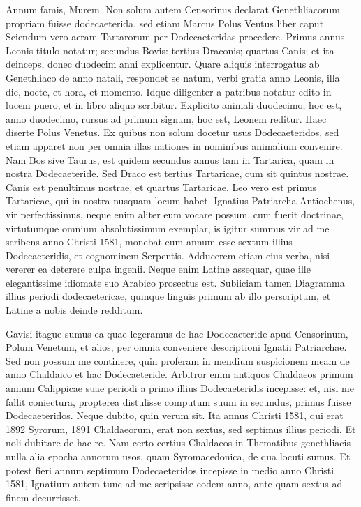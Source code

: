 Annum famis, Murem.
Non solum
autem Censorinus %
 declarat Genethliacorum propriam fuisse dodecaeterida,
sed etiam Marcus Polus Ventus liber  caput 
Sciendum vero
aeram Tartarorum per Dodecaeteridas procedere.
Primus annus Leonis
titulo notatur; secundus Bovis: tertius Draconis; quartus Canis; et
ita deinceps, donec duodecim anni explicentur.
Quare aliquis interrogatus
ab %
 Genethliaco de anno natali, respondet se natum, verbi gratia
anno Leonis, illa die, nocte, et hora, et momento.
Idque diligenter
a patribus notatur edito in lucem puero, et in libro aliquo scribitur.
%
Explicito animali duodecimo, hoc est, anno duodecimo,
 rursus ad
primum signum, hoc est, Leonem reditur.
Haec diserte Polus Venetus.
Ex quibus non solum docetur usus Dodecaeteridos, sed etiam apparet
non per omnia illas nationes in nominibus animalium convenire.
Nam Bos sive Taurus, est quidem secundus annus tam in Tartarica,
quam in nostra Dodecaeteride.
Sed Draco est tertius Tartaricae, cum
sit quintus nostrae.
Canis est penultimus nostrae, et quartus Tartaricae.
Leo vero est primus Tartaricae, qui in nostra nusquam locum habet.
Ignatius Patriarcha Antiochenus, vir perfectissimus, neque enim aliter
eum vocare possum, cum fuerit doctrinae, virtutumque omnium
absolutissimum exemplar, is igitur summus vir ad me scribens anno
Christi 1581, monebat eum annum esse sextum illius Dodecaeteridis,
et cognominem Serpentis.
Adducerem etiam eius verba, nisi vererer
ea deterere culpa ingenii.
Neque enim Latine assequar, quae ille elegantissime
idiomate suo Arabico prosectus est.
Subiiciam tamen
Diagramma illius periodi dodecaetericae, quinque linguis primum ab
illo perscriptum, et Latine a nobis deinde redditum. %
%
\begin{table}[tb]
  
\end{table}
%
Gavisi itague sumus ea quae legeramus de hac
 Dodecaeteride apud
Censorinum, Polum Venetum, et alios, per omnia conveniere descriptioni
Ignatii Patriarchae.
Sed non possum me continere, quin proferam
in mendium suspicionem meam de anno Chaldaico et hac Dodecaeteride.
Arbitror enim antiquos Chaldaeos primum annum
Calippicae suae periodi a primo illius Dodecaeteridis incepisse: et, nisi
me fallit coniectura, propterea distulisse computum suum in secundus,
primus fuisse Dodecaeteridos.
Neque dubito, quin verum sit.
Ita
annus Christi 1581, qui erat 1892 Syrorum, 1891 Chaldaeorum, erat
non sextus, sed septimus illius periodi.
Et noli dubitare de hac re.
Nam
certo certius Chaldaeos in Thematibus genethliacis nulla alia epocha
annorum usos, quam Syromacedonica, de qua locuti sumus.
Et potest fieri annum septimum Dodecaeteridos incepisse in medio anno
Christi 1581, Ignatium autem tunc ad me scripsisse eodem anno, ante
quam sextus ad finem decurrisset.
%

